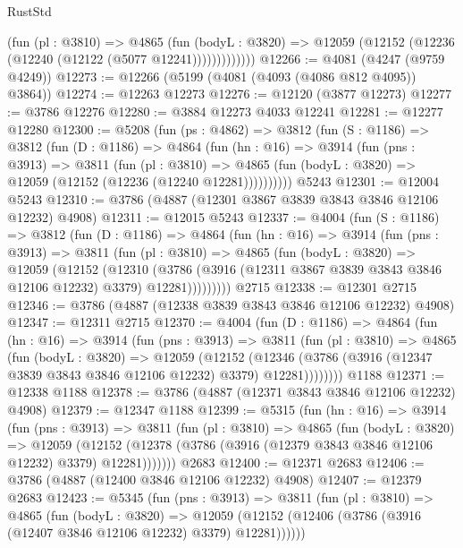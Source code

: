 \begin{lexlean}{RustStd}
\begin{coremodule}
                (fun (pl : @3810) =>
                @4865
                  (fun (bodyL : @3820) =>
                  @12059 (@12152 (@12236 (@12240 (@12122 (@5077 @12241)))))))))))))
@12266 := @4081 (@4247 (@9759 @4249))
@12273 := @12266 (@5199 (@4081 (@4093 (@4086 @812 @4095)) @3864))
@12274 := @12263 @12273
@12276 := @12120 (@3877 @12273)
@12277 := @3786 @12276
@12280 := @3884 @12273 @4033 @12241
@12281 := @12277 @12280
@12300 := @5208
    (fun (ps : @4862) =>
    @3812
      (fun (S : @1186) =>
      @3812
        (fun (D : @1186) =>
        @4864
          (fun (hn : @16) =>
          @3914
            (fun (pns : @3913) =>
            @3811
              (fun (pl : @3810) =>
              @4865 (fun (bodyL : @3820) => @12059 (@12152 (@12236 (@12240 @12281))))))))))
    @5243
@12301 := @12004 @5243
@12310 := @3786 (@4887 (@12301 @3867 @3839 @3843 @3846 @12106 @12232) @4908)
@12311 := @12015 @5243
@12337 := @4004
    (fun (S : @1186) =>
    @3812
      (fun (D : @1186) =>
      @4864
        (fun (hn : @16) =>
        @3914
          (fun (pns : @3913) =>
          @3811
            (fun (pl : @3810) =>
            @4865
              (fun (bodyL : @3820) =>
              @12059
                (@12152
                  (@12310
                    (@3786
                      (@3916 (@12311 @3867 @3839 @3843 @3846 @12106 @12232) @3379)
                      @12281)))))))))
    @2715
@12338 := @12301 @2715
@12346 := @3786 (@4887 (@12338 @3839 @3843 @3846 @12106 @12232) @4908)
@12347 := @12311 @2715
@12370 := @4004
    (fun (D : @1186) =>
    @4864
      (fun (hn : @16) =>
      @3914
        (fun (pns : @3913) =>
        @3811
          (fun (pl : @3810) =>
          @4865
            (fun (bodyL : @3820) =>
            @12059
              (@12152
                (@12346 (@3786 (@3916 (@12347 @3839 @3843 @3846 @12106 @12232) @3379) @12281))))))))
    @1188
@12371 := @12338 @1188
@12378 := @3786 (@4887 (@12371 @3843 @3846 @12106 @12232) @4908)
@12379 := @12347 @1188
@12399 := @5315
    (fun (hn : @16) =>
    @3914
      (fun (pns : @3913) =>
      @3811
        (fun (pl : @3810) =>
        @4865
          (fun (bodyL : @3820) =>
          @12059
            (@12152 (@12378 (@3786 (@3916 (@12379 @3843 @3846 @12106 @12232) @3379) @12281)))))))
    @2683
@12400 := @12371 @2683
@12406 := @3786 (@4887 (@12400 @3846 @12106 @12232) @4908)
@12407 := @12379 @2683
@12423 := @5345
    (fun (pns : @3913) =>
    @3811
      (fun (pl : @3810) =>
      @4865
        (fun (bodyL : @3820) =>
        @12059 (@12152 (@12406 (@3786 (@3916 (@12407 @3846 @12106 @12232) @3379) @12281))))))

\end{coremodule}
\end{lexlean}
